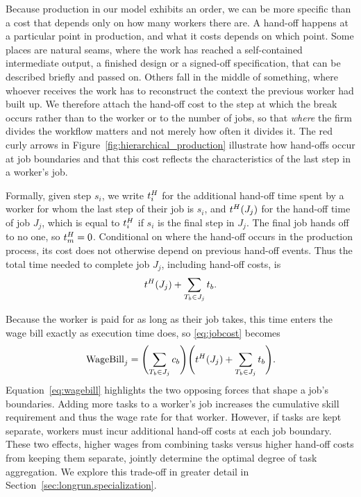Because production in our model exhibits an order, we can be more specific than a cost that depends only on how many workers there are.
A hand-off happens at a particular point in production, and what it costs depends on which point.
Some places are natural seams, where the work has reached a self-contained intermediate output, a finished design or a signed-off specification, that can be described briefly and passed on.
Others fall in the middle of something, where whoever receives the work has to reconstruct the context the previous worker had built up.
We therefore attach the hand-off cost to the step at which the break occurs rather than to the worker or to the number of jobs, so that \emph{where} the firm divides the workflow matters and not merely how often it divides it.
The red curly arrows in Figure~\ref{fig:hierarchical_production} illustrate how hand-offs occur at job boundaries and that this cost reflects the characteristics of the last step in a worker's job.

Formally, given step $s_i$, we write $t^{H}_{i}$ for the additional hand-off time spent by a worker for whom the last step of their job is $s_i$, and $t^{H}_{}(J_j)$ for the hand-off time of job $J_j$, which is equal to $t^{H}_{i}$ if $s_i$ is the final step in $J_j$.
The final job hands off to no one, so $t^{H}_{m} = 0$.
Conditional on where the hand-off occurs in the production process, its cost does not otherwise depend on previous hand-off events.
Thus the total time needed to complete job $J_j$, including hand-off costs, is
\[
t^{H}_{}(J_j) + \sum_{T_b \in J_j} t_{b}.
\]

Because the worker is paid for as long as their job takes, this time enters the wage bill exactly as execution time does, so \eqref{eq:jobcost} becomes
\begin{align}
\label{eq:wagebill}
\text{WageBill}_j = \Biggl(\sum_{T_b \in J_j} c_{b} \Biggr) \Biggl(t^{H}_{}(J_j) + \sum_{T_b \in J_j} t_{b} \Biggr).
\end{align}
Equation~\eqref{eq:wagebill} highlights the two opposing forces that shape a job's boundaries.
Adding more tasks to a worker's job increases the cumulative skill requirement and thus the wage rate for that worker.
However, if tasks are kept separate, workers must incur additional hand-off costs at each job boundary.
These two effects, higher wages from combining tasks versus higher hand-off costs from keeping them separate, jointly determine the optimal degree of task aggregation.
We explore this trade-off in greater detail in Section~\ref{sec:longrun.specialization}.

